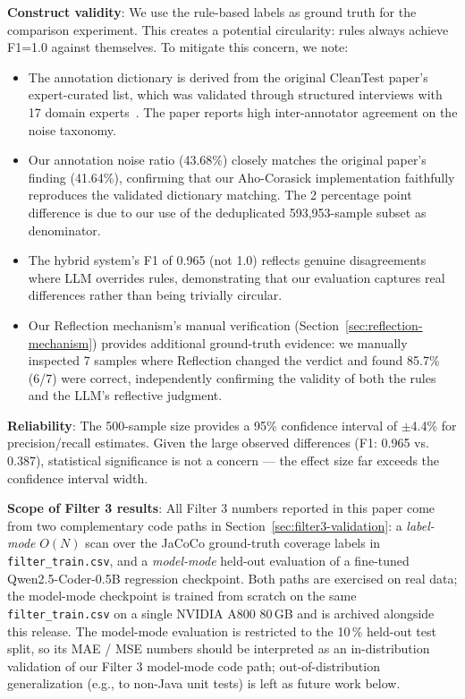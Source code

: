 \documentclass[acmlarge,nonacm,screen]{acmart}
\begin{document}
\textbf{Construct validity}: We use the rule-based labels as ground truth for the comparison experiment. This creates a potential circularity: rules always achieve F1=1.0 against themselves. To mitigate this concern, we note:
\begin{itemize}
    \item The annotation dictionary is derived from the original CleanTest paper's expert-curated list, which was validated through structured interviews with 17 domain experts~\cite{zhang2025cleantest}. The paper reports high inter-annotator agreement on the noise taxonomy.
    \item Our annotation noise ratio (43.68\%) closely matches the original paper's finding (41.64\%), confirming that our Aho-Corasick implementation faithfully reproduces the validated dictionary matching. The 2 percentage point difference is due to our use of the deduplicated 593,953-sample subset as denominator.
    \item The hybrid system's F1 of 0.965 (not 1.0) reflects genuine disagreements where LLM overrides rules, demonstrating that our evaluation captures real differences rather than being trivially circular.
    \item Our Reflection mechanism's manual verification (Section~\ref{sec:reflection-mechanism}) provides additional ground-truth evidence: we manually inspected 7 samples where Reflection changed the verdict and found 85.7\% (6/7) were correct, independently confirming the validity of both the rules and the LLM's reflective judgment.
\end{itemize}

\textbf{Reliability}: The 500-sample size provides a 95\% confidence interval of $\pm$4.4\% for precision/recall estimates. Given the large observed differences (F1: 0.965 vs. 0.387), statistical significance is not a concern --- the effect size far exceeds the confidence interval width.

\textbf{Scope of Filter 3 results}: All Filter 3 numbers reported in
this paper come from two complementary code paths in
Section~\ref{sec:filter3-validation}: a \emph{label-mode}
$O(N)$ scan over the JaCoCo ground-truth coverage labels in
\texttt{filter\_train.csv}, and a \emph{model-mode} held-out
evaluation of a fine-tuned Qwen2.5-Coder-0.5B regression
checkpoint. Both paths are exercised on real data; the model-mode
checkpoint is trained from scratch on the same
\texttt{filter\_train.csv} on a single NVIDIA A800 80\,GB and is
archived alongside this release. The model-mode evaluation is
restricted to the 10\,\% held-out test split, so its MAE / MSE
numbers should be interpreted as an in-distribution validation of
our Filter 3 model-mode code path; out-of-distribution
generalization (e.g., to non-Java unit tests) is left as future
work below.
\end{document}
